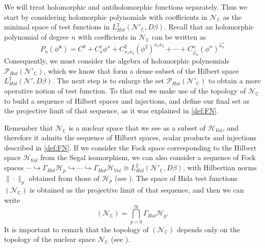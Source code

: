 \documentclass[12pt]{article}%
\begin{document}
We will treat holomorphic and antiholomorphic functions separately. Thus we start by considering  holomorphic polynomials with coefficients in  $\mathcal{N}_{\mathbb{C}}$ as the minimal space of test functions in $L^2_{Hol}(\mathcal{N}'_{\mathbb{C}},D\beta)$. Recall that an holomorphic polynomial of degree $n$ with coefficients in $\mathcal{N}_{\mathbb{C}}$ can be written as
\begin{equation}
\label{eq:polynomials} 
P_n(\phi^{\mathbf{x}})= C^0+C^1_x\phi^x+C^{2}_{x_1x_2}(\phi^2)^{x_1x_2}+\cdots+C^n_{\vec{x}_n}(\phi^n)^{\vec{x_n}}
\end{equation}    
Consequently, we must consider  the algebra of holomorphic polynomials $\mathcal{P}_{Hol}(\mathcal{N}'_{\mathbb{C}})$, which we know that  form a dense subset of the Hilbert space $L^2_{Hol}(\mathcal{N}', D\beta)$. The next step is to enlarge the set $\mathcal{P}_{Hol}(\mathcal{N}'_{\mathbb{C}})$ to obtain a more operative notion of test function.   To that end we make use of the topology of $\mathcal{N}_{\mathbb{C}}$ to build a sequence of Hilbert spaces and injections, and define our final set as the projective limit of that sequence, as it was explained in \autoref{def:FN}.

 Remember that $\mathcal{N}_{\mathbb{C}}$ is a nuclear space that we see as a subset of $\mathcal{H}_{Vol}$, and therefore it admits the sequence of Hilbert spaces, scalar products and injections described in \autoref{def:FN}. If we consider the Fock space corresponding to the Hilbert space $\mathcal{H}_{Vol}$ from the Segal isomorphism, we can also consider a sequence of Fock spaces $\cdots \hookrightarrow \Gamma_{Hol} \mathcal{H}_p\hookrightarrow \cdots \hookrightarrow  \Gamma_{Hol} \mathcal{H}_{Vol}\cong L^2_{Hol}(\mathcal{N}'_{\mathbb{C}},D\beta)$, with Hilbertian norms $\| \cdot \|_p$ obtained from those of $\mathcal{H}_p$ (see \cite{Kondratiev1996}). The space of Hida test functions $(\mathcal{N}_{\mathbb{C}})$ is obtained as the projective limit of that sequence, and then we can write
\begin{equation}
\label{eq:Hidatestfunction}
(\mathcal{N}_{\mathbb{C}})=\bigcap_{p=0}^\infty \Gamma_{Hol} \mathcal{H}_p.
\end{equation}
It is important to remark that the topology of $(\mathcal{N}_{\mathbb{C}})$ depends only on the topology of the nuclear space $\mathcal{N}_{\mathbb{C}}$ (see \cite{Kondratiev1996}).
\end{document}
